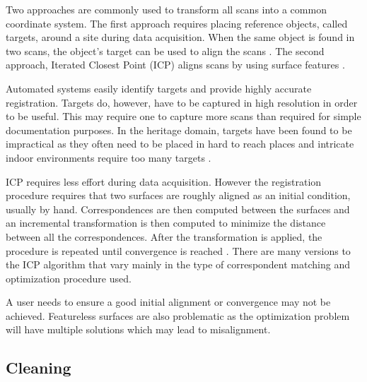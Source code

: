 Two approaches are commonly used to transform all scans into a common coordinate system. The first approach requires placing reference objects, called targets, around a site during data acquisition. When the same object is found in two scans, the object's target can be used to align the scans \cite{Besl1992}. The second approach, Iterated Closest Point (ICP) aligns scans by using surface features \cite{Bernardini2002}.

Automated systems easily identify targets and provide highly accurate registration. Targets do, however, have to be captured in high resolution in order to be useful. This may require one to capture more scans than required for simple documentation purposes. In the heritage domain, targets have been found to be impractical as they often need to be placed in hard to reach places and intricate indoor environments require too many targets \cite{Ruther2011}.

ICP requires less effort during data acquisition. However the registration procedure requires that two surfaces are roughly aligned as an initial condition, usually by hand. Correspondences are then computed between the surfaces and an incremental transformation is then computed to minimize the distance between all the correspondences. After the transformation is applied, the procedure is repeated until convergence is reached \cite{Rusinkiewicz}. There are many versions to the ICP algorithm that vary mainly in the type of correspondent matching and optimization procedure used.

A user needs to ensure a good initial alignment or convergence may not be achieved. Featureless surfaces are also problematic as the optimization problem will have multiple solutions which may lead to misalignment.

\subsection{Cleaning}\label{sec:cleaning}

